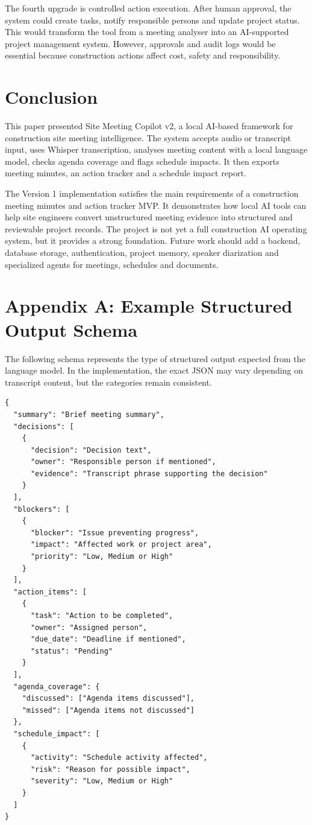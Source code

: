 \documentclass[11pt,a4paper]{article}
\begin{document}
The fourth upgrade is controlled action execution. After human approval, the system could create tasks, notify responsible persons and update project status. This would transform the tool from a meeting analyser into an AI-supported project management system. However, approvals and audit logs would be essential because construction actions affect cost, safety and responsibility.

\section{Conclusion}

This paper presented Site Meeting Copilot v2, a local AI-based framework for construction site meeting intelligence. The system accepts audio or transcript input, uses Whisper transcription, analyses meeting content with a local language model, checks agenda coverage and flags schedule impacts. It then exports meeting minutes, an action tracker and a schedule impact report.

The Version 1 implementation satisfies the main requirements of a construction meeting minutes and action tracker MVP. It demonstrates how local AI tools can help site engineers convert unstructured meeting evidence into structured and reviewable project records. The project is not yet a full construction AI operating system, but it provides a strong foundation. Future work should add a backend, database storage, authentication, project memory, speaker diarization and specialized agents for meetings, schedules and documents.

\newpage

\section*{Appendix A: Example Structured Output Schema}

The following schema represents the type of structured output expected from the language model. In the implementation, the exact JSON may vary depending on transcript content, but the categories remain consistent.

\begin{verbatim}
{
  "summary": "Brief meeting summary",
  "decisions": [
    {
      "decision": "Decision text",
      "owner": "Responsible person if mentioned",
      "evidence": "Transcript phrase supporting the decision"
    }
  ],
  "blockers": [
    {
      "blocker": "Issue preventing progress",
      "impact": "Affected work or project area",
      "priority": "Low, Medium or High"
    }
  ],
  "action_items": [
    {
      "task": "Action to be completed",
      "owner": "Assigned person",
      "due_date": "Deadline if mentioned",
      "status": "Pending"
    }
  ],
  "agenda_coverage": {
    "discussed": ["Agenda items discussed"],
    "missed": ["Agenda items not discussed"]
  },
  "schedule_impact": [
    {
      "activity": "Schedule activity affected",
      "risk": "Reason for possible impact",
      "severity": "Low, Medium or High"
    }
  ]
}
\end{verbatim}
\end{document}
